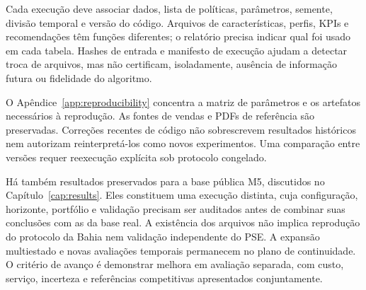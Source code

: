 Cada execução deve associar dados, lista de políticas, parâmetros, semente, divisão temporal e versão do código. Arquivos de características, perfis, KPIs e recomendações têm funções diferentes; o relatório precisa indicar qual foi usado em cada tabela. Hashes de entrada e manifesto de execução ajudam a detectar troca de arquivos, mas não certificam, isoladamente, ausência de informação futura ou fidelidade do algoritmo.

O Apêndice~\ref{app:reproducibility} concentra a matriz de parâmetros e os artefatos necessários à reprodução. As fontes de vendas e PDFs de referência são preservadas. Correções recentes de código não sobrescrevem resultados históricos nem autorizam reinterpretá-los como novos experimentos. Uma comparação entre versões requer reexecução explícita sob protocolo congelado.

Há também resultados preservados para a base pública M5, discutidos no Capítulo~\ref{cap:results}. Eles constituem uma execução distinta, cuja configuração, horizonte, portfólio e validação precisam ser auditados antes de combinar suas conclusões com as da base real. A existência dos arquivos não implica reprodução do protocolo da Bahia nem validação independente do PSE. A expansão multiestado e novas avaliações temporais permanecem no plano de continuidade. O critério de avanço é demonstrar melhora em avaliação separada, com custo, serviço, incerteza e referências competitivas apresentados conjuntamente.
